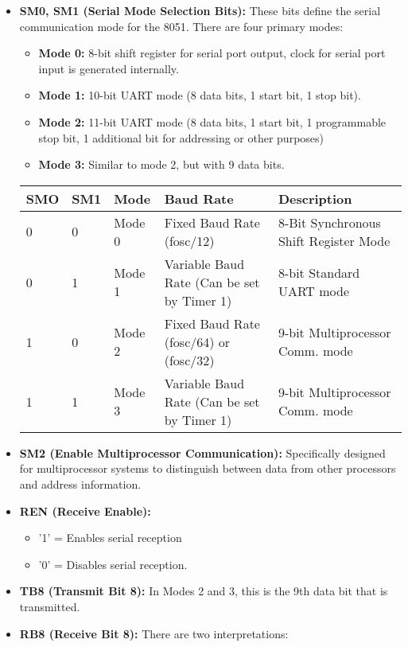 \documentclass[
]{article}
\begin{document}
\begin{itemize}
\item
  \textbf{SM0, SM1 (Serial Mode Selection Bits):} These bits define the
  serial communication mode for the 8051. There are four primary modes:

  \begin{itemize}
  \item
    \textbf{Mode 0:} 8-bit shift register for serial port output, clock
    for serial port input is generated internally.
  \item
    \textbf{Mode 1:} 10-bit UART mode (8 data bits, 1 start bit, 1 stop
    bit).
  \item
    \textbf{Mode 2:} 11-bit UART mode (8 data bits, 1 start bit, 1
    programmable stop bit, 1 additional bit for addressing or other
    purposes)
  \item
    \textbf{Mode 3:} Similar to mode 2, but with 9 data bits.
  \end{itemize}

  \begin{longtable}[]{@{}lllll@{}}
  \toprule
  SMO & SM1 & Mode & Baud Rate & Description \\
  \midrule
  \endhead
  0 & 0 & Mode 0 & Fixed Baud Rate (fosc/12) & 8-Bit Synchronous Shift
  Register Mode \\
  0 & 1 & Mode 1 & Variable Baud Rate (Can be set by Timer 1) & 8-bit
  Standard UART mode \\
  1 & 0 & Mode 2 & Fixed Baud Rate (fosc/64) or (fosc/32) & 9-bit
  Multiprocessor Comm. mode \\
  1 & 1 & Mode 3 & Variable Baud Rate (Can be set by Timer 1) & 9-bit
  Multiprocessor Comm. mode \\
  \bottomrule
  \end{longtable}
\item
  \textbf{SM2 (Enable Multiprocessor Communication):} Specifically
  designed for multiprocessor systems to distinguish between data from
  other processors and address information.
\item
  \textbf{REN (Receive Enable):}

  \begin{itemize}
  \item
    '1' = Enables serial reception
  \item
    '0' = Disables serial reception.
  \end{itemize}
\item
  \textbf{TB8 (Transmit Bit 8):} In Modes 2 and 3, this is the 9th data
  bit that is transmitted.
\item
  \textbf{RB8 (Receive Bit 8):} There are two interpretations:


\end{itemize}
\end{document}

